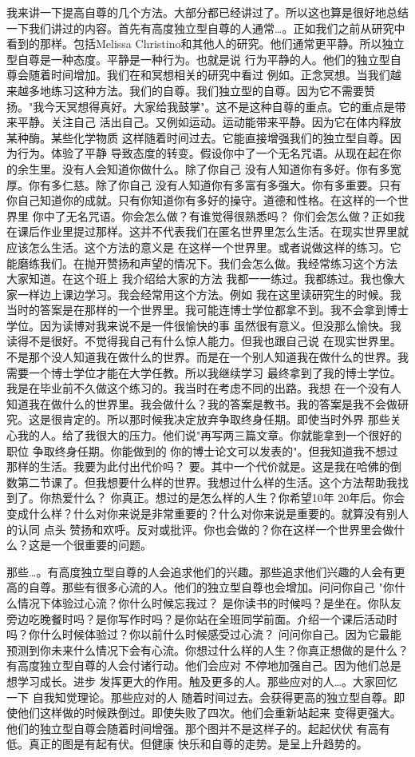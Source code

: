 我来讲一下提高自尊的几个方法。大部分都已经讲过了。所以这也算是很好地总结一下我们讲过的内容。首先有高度独立型自尊的人通常…。正如我们之前从研究中看到的那样。包括Melissa Christino和其他人的研究。他们通常更平静。所以独立型自尊是一种态度。平静是一种行为。也就是说 行为平静的人。他们的独立型自尊会随着时间增加。我们在和冥想相关的研究中看过 例如。正念冥想。当我们越来越多地练习这种方法。我们的自尊。我们独立型的自尊。因为它不需要赞扬。"我今天冥想得真好。大家给我鼓掌"。这不是这种自尊的重点。它的重点是带来平静。关注自己 活出自己。又例如运动。运动能带来平静。因为它在体内释放某种酶。某些化学物质 这样随着时间过去。它能直接增强我们的独立型自尊。因为行为。体验了平静 导致态度的转变。假设你中了一个无名咒语。从现在起在你的余生里。没有人会知道你做什么。除了你自己 没有人知道你有多好。你有多宽厚。你有多仁慈。除了你自己 没有人知道你有多富有多强大。你有多重要。只有你自己知道你的成就。只有你知道你有多好的操守。道德和性格。在这样的一个世界里 你中了无名咒语。你会怎么做？有谁觉得很熟悉吗？ 你们会怎么做？正如我在课后作业里提过那样。这并不代表我们在匿名世界里怎么生活。在现实世界里就应该怎么生活。这个方法的意义是 在这样一个世界里。或者说做这样的练习。它能磨练我们。在抛开赞扬和声望的情况下。我们会怎么做。我经常练习这个方法 大家知道。在这个班上 我介绍给大家的方法 我都一一练过。我都练过。我也像大家一样边上课边学习。我会经常用这个方法。例如 我在这里读研究生的时候。我当时的答案是在那样的一个世界里。我可能连博士学位都拿不到。我不会拿到博士学位。因为读博对我来说不是一件很愉快的事 虽然很有意义。但没那么愉快。我读得不是很好。不觉得我自己有什么惊人能力。但我也跟自己说 在现实世界里。不是那个没人知道我在做什么的世界。而是在一个别人知道我在做什么的世界。我需要一个博士学位才能在大学任教。所以我继续学习 最终拿到了我的博士学位。我是在毕业前不久做这个练习的。我当时在考虑不同的出路。我想 在一个没有人知道我在做什么的世界里。我会做什么？我的答案是教书。我的答案是我不会做研究。这是很肯定的。所以那时候我决定放弃争取终身任期。即使当时外界 那些关心我的人。给了我很大的压力。他们说"再写两三篇文章。你就能拿到一个很好的职位 争取终身任期。你能做到的 你的博士论文可以发表的"。但我知道我不想过那样的生活。我要为此付出代价吗？ 要。其中一个代价就是。这是我在哈佛的倒数第二节课了。但我想要什么样的世界。我想过什么样的生活。这个方法帮助我找到了。你热爱什么？ 你真正。想过的是怎么样的人生？你希望10年 20年后。你会变成什么样？什么对你来说是非常重要的？什么对你来说是重要的。就算没有别人的认同 点头 赞扬和欢呼。反对或批评。你也会做的？你在这样一个世界里会做什么？这是一个很重要的问题。 

那些…。有高度独立型自尊的人会追求他们的兴趣。那些追求他们兴趣的人会有更高的自尊。那些有很多心流的人。他们的独立型自尊也会增加。问问你自己 "你什么情况下体验过心流？你什么时候忘我过？ 是你读书的时候吗？是坐在。你队友旁边吃晚餐时吗？是你写作时吗？是你站在全班同学前面。介绍一个课后活动时吗？你什么时候体验过？你以前什么时候感受过心流？ 问问你自己。因为它最能预测到你未来什么情况下会有心流。你想过什么样的人生？你真正想做的是什么？有高度独立型自尊的人会付诸行动。他们会应对 不停地加强自己。因为他们总是想学习成长。进步 发挥更大的作用。触及更多的人。那些应对的人…。大家回忆一下 自我知觉理论。那些应对的人 随着时间过去。会获得更高的独立型自尊。即使他们这样做的时候跌倒过。即使失败了四次。他们会重新站起来 变得更强大。他们的独立型自尊会随着时间增强。那个图并不是这样子的。起起伏伏 有高有低。真正的图是有起有伏。但健康 快乐和自尊的走势。是呈上升趋势的。 

